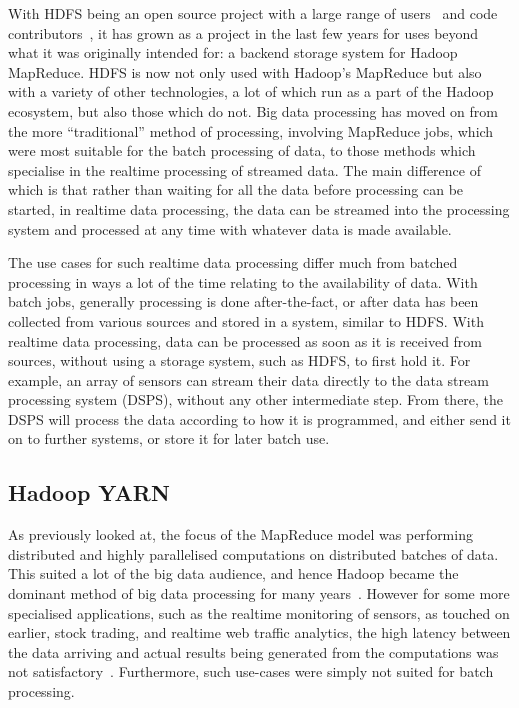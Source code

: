 With HDFS being an open source project with a large range of users~\cite{hadoop_users} and code
contributors~\cite{hadoop_committers}, it has grown as a project in the last few years for uses beyond what it was
originally intended for: a backend storage system for Hadoop MapReduce. HDFS is now not only used with Hadoop's
MapReduce but also with a variety of other technologies, a lot of which run as a part of the Hadoop ecosystem, but
also those which do not.
Big data processing has moved on from the more ``traditional'' method of processing, involving MapReduce jobs, which
were most suitable for the batch processing of data, to those methods which specialise in the realtime processing of
streamed data.
The main difference of which is that rather than waiting for all the data before processing can be started, in realtime
data processing, the data can be streamed into the processing system and processed at any time with whatever data is
made available.

The use cases for such realtime data processing differ much from batched processing in ways a lot of the time relating
to the availability of data. With batch jobs, generally processing is done after-the-fact, or after data has been
collected from various sources and stored in a system, similar to HDFS. With realtime data processing, data can be
processed as soon as it is received from sources, without using a storage system, such as HDFS, to first hold it.
For example, an array of sensors can stream their data directly to the data stream processing system (DSPS), without
any other intermediate step. From there, the DSPS will process the data according to how it is programmed, and either
send it on to further systems, or store it for later batch use.


\subsection{Hadoop YARN} %
\label{ssub:apache_hadoop_yarn_}

As previously looked at, the focus of the MapReduce model was performing distributed and highly parallelised computations
on distributed batches of data. This suited a lot of the big data audience, and hence Hadoop became the dominant
method of big data processing for many years~\cite{liu_survey_2014}. However for some more specialised applications, such as
the realtime monitoring of sensors, as touched on earlier, stock trading, and realtime web traffic analytics, the high
latency between the data arriving and actual results being generated from the computations was not
satisfactory~\cite{kamburugamuve_survey_2014}. Furthermore, such use-cases were simply not suited for batch processing.

